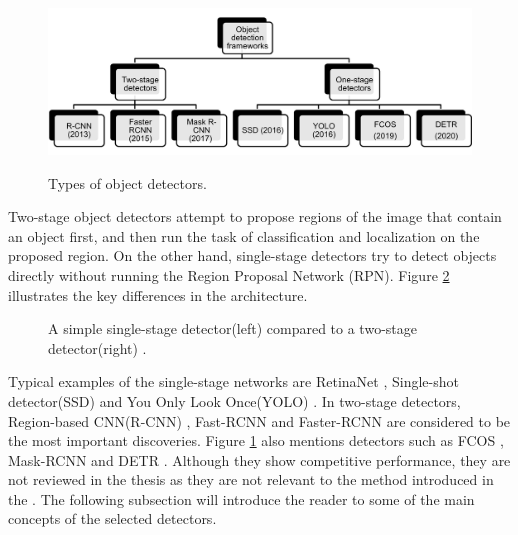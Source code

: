 \begin{figure}[htb]
	\begin{center}
		\includegraphics[width=16cm]{./OD.png}
	\end{center}
	\caption{Types of object detectors.}
	\begin{center}
		\label{OD}
	\end{center}
\end{figure}
\FloatBarrier

Two-stage object detectors attempt to propose regions of the image that contain an object first, and then run the task of classification and localization on the proposed region. On the other hand, single-stage detectors try to detect objects directly without running the  Region Proposal Network (RPN). Figure \ref{fig:1vs2stage} illustrates the key differences in the architecture.

\begin{figure}[htb]
    \centering
    \qquad
    \caption{A simple single-stage detector(left) compared to a two-stage detector(right) \cite{app8091488}.}\label{fig:1vs2stage}%
\end{figure}
\FloatBarrier

Typical examples of the single-stage networks are RetinaNet \cite{Lin2017}, Single-shot detector(SSD) \cite{Liu2015} and You Only Look Once(YOLO) \cite{Redmon2015a}. In two-stage detectors, Region-based CNN(R-CNN) \cite{Girshick2013}, Fast-RCNN \cite{Girshick2015} and Faster-RCNN \cite{ima} are considered to be the most important discoveries. Figure \ref{OD} also mentions detectors such as FCOS \cite{Tian2019}, Mask-RCNN \cite{He2017} and DETR \cite{Carion2020}. Although they show competitive performance, they are not reviewed in the thesis as they are not relevant to the method introduced in the .  The following subsection will introduce the reader to some of the main concepts of the selected detectors. 


